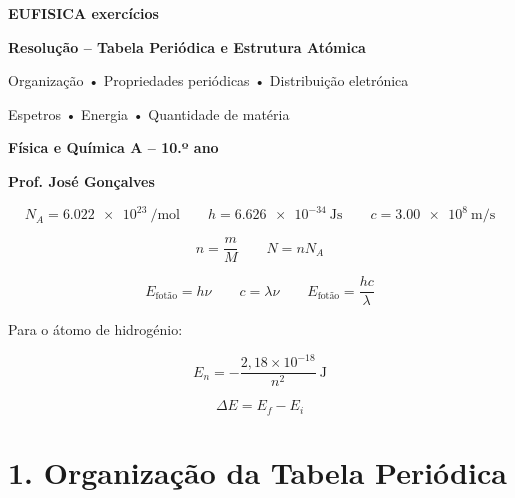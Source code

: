 \documentclass[11pt,a4paper]{article}
\begin{document}
\begin{tcolorbox}[
    enhanced,
    colback=eudark,
    colframe=eudark,
    arc=3mm,
    boxrule=0pt,
    left=5mm,
    right=5mm,
    top=5mm,
    bottom=5mm
]
\begin{center}
{\Huge\bfseries\color{white} EUFISICA exercícios}

\vspace{2mm}

{\Large\bfseries\color{white} Resolução -- Tabela Periódica e Estrutura Atómica}

\vspace{2mm}

{\large\color{eulightblue} Organização • Propriedades periódicas • Distribuição eletrónica}

{\large\color{eulightblue} Espetros • Energia • Quantidade de matéria}

\vspace{3mm}

{\large\color{white}\textbf{Física e Química A -- 10.º ano}}

\vspace{2mm}

{\color{white}\textbf{Prof. José Gonçalves}}
\end{center}
\end{tcolorbox}

\begin{recorda}
\[
N_A=\SI{6.022e23}{\per\mole}
\qquad
h=\SI{6.626e-34}{\joule\second}
\qquad
c=\SI{3.00e8}{\meter\per\second}
\]

\[
n=\frac{m}{M}
\qquad
N=nN_A
\]

\[
E_{\text{fotão}}=h\nu
\qquad
c=\lambda\nu
\qquad
E_{\text{fotão}}=\frac{hc}{\lambda}
\]

Para o átomo de hidrogénio:

\[
\boxed{E_n=-\frac{2,18\times10^{-18}}{n^2}\ \mathrm{J}}
\]

\[
\boxed{\Delta E=E_f-E_i}
\]
\end{recorda}

\section*{\textcolor{eublue}{1. Organização da Tabela Periódica}}
\end{document}
